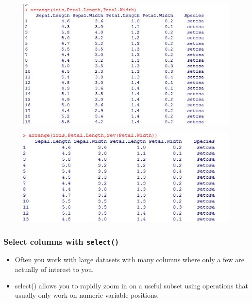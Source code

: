 \documentclass{beamer}
\begin{document}
\begin{frame}
	\begin{figure}
		\centering
		\includegraphics[width=0.97\linewidth]{irisarrange}
		
	\end{figure}
	
\end{frame}


\begin{frame}
	\begin{figure}
		\centering
		\includegraphics[width=0.97\linewidth]{irisarrange2}
		
	\end{figure}
	
\end{frame}


\begin{frame}
\frametitle{Select columns with \texttt{select()}}
\begin{itemize}
\item Often you work with large datasets with many columns where only a few are actually of interest to you. 
\item select() allows you to rapidly zoom in on a useful subset using operations that usually only work on numeric variable positions.
\end{itemize}
\end{frame}
\end{document}
